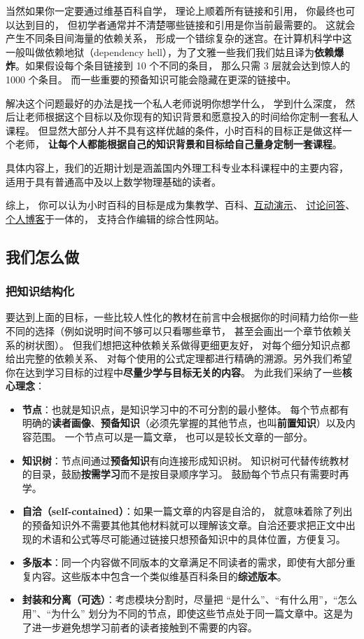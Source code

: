 当然如果你一定要通过维基百科自学， 理论上顺着所有链接和引用， 你最终也可以达到目的， 但初学者通常并不清楚哪些链接和引用是你当前最需要的。 这就会产生不同条目间海量的依赖关系， 形成一个错综复杂的迷宫。在计算机科学中这一般叫做依赖地狱（dependency hell），为了文雅一些我们我们姑且译为\textbf{依赖爆炸}。如果假设每个条目链接到 10 个不同的条目， 那么只需 3 层就会达到惊人的 1000 个条目。 而一些重要的预备知识可能会隐藏在更深的链接中。

解决这个问题最好的办法是找一个私人老师说明你想学什么， 学到什么深度， 然后让老师根据这个目标以及你现有的知识背景和愿意投入的时间给你定制一套私人课程。 但显然大部分人并不具有这样优越的条件，小时百科的目标正是做这样一个老师， \textbf{让每个人都能根据自己的知识背景和目标给自己量身定制一套课程}。

具体内容上，我们的近期计划是涵盖国内外理工科专业本科课程中的主要内容， 适用于具有普通高中及以上数学物理基础的读者。

综上， 你可以认为小时百科的目标是成为集教学、百科、\href{http://wuli.wiki/apps}{互动演示}、 \href{http://wuli.wiki/forum}{讨论问答}、 \href{http://wuli.wiki/note}{个人博客}于一体的， 支持合作编辑的综合性网站。

\subsection{我们怎么做}

\subsubsection{把知识结构化}
要达到上面的目标，一些比较人性化的教材在前言中会根据你的时间精力给你一些不同的选择（例如说明时间不够可以只看哪些章节， 甚至会画出一个章节依赖关系的树状图）。 但我们想把这种依赖关系做得更细更友好， 对每个细分知识点都给出完整的依赖关系、 对每个使用的公式定理都进行精确的溯源。另外我们希望你在达到学习目标的过程中\textbf{尽量少学与目标无关的内容}。 为此我们采纳了一些\textbf{核心理念}：
\begin{itemize}
\item \textbf{节点}：也就是知识点，是知识学习中的不可分割的最小整体。 每个节点都有明确的\textbf{读者画像}、\textbf{预备知识}（必须先掌握的其他节点，也叫\textbf{前置知识}）以及内容范围。 一个节点可以是一篇文章， 也可以是较长文章的一部分。
\item \textbf{知识树}：节点间通过\textbf{预备知识}有向连接形成知识树。 知识树可代替传统教材的目录，鼓励\textbf{按需学习}而不是按目录顺序学习。 鼓励每个节点只有需要时再学。
\item \textbf{自洽（self-contained）}：如果一篇文章的内容是自洽的， 就意味着除了列出的预备知识外不需要其他其他材料就可以理解该文章。自洽还要求把正文中出现的术语和公式等尽可能通过链接只想预备知识中的具体位置，方便复习。
\item \textbf{多版本}：同一个内容做不同版本的文章满足不同读者的需求，即使有大部分重复内容。这些版本中包含一个类似维基百科条目的\textbf{综述版本}。
\item \textbf{封装和分离（可选）}：考虑模块分割时，尽量把 “是什么”、“有什么用”，“怎么用”、“为什么” 划分为不同的节点，即使这些节点处于同一篇文章中。这是为了进一步避免想学习前者的读者接触到不需要的内容。
\end{itemize}

